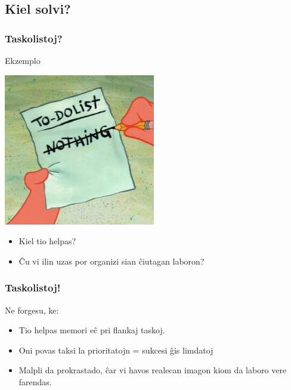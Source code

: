 \documentclass{beamer}
\begin{document}
   
\subsection{Kiel solvi?}
   
  \begin{frame}
    \frametitle{Taskolistoj?}

	\begin{block}{Ekzemplo}
    	\begin{center}
    	\includegraphics[scale=0.5]{meme/to_do_list}
    	\end{center}
	\end{block}
    
    \begin{itemize}
    	\item Kiel tio helpas?
    	\item Ĉu vi ilin uzas por organizi sian ĉiutagan laboron?
    \end{itemize}
        
  \end{frame}    


   
  \begin{frame}
    \frametitle{Taskolistoj!}
    Ne forgesu, ke:
    \begin{itemize}
    	\item Tio helpas memori eĉ pri flankaj taskoj.
     	\item Oni povas taksi la prioritatojn = sukcesi ĝis limdatoj
        \item Malpli da prokrastado, ĉar vi havos realecan imagon kiom da laboro vere farendas.      
    \end{itemize}
  \end{frame}      
\end{document}
